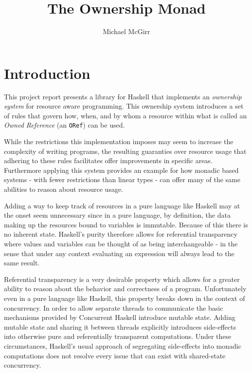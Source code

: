\documentclass[onehalf,11pt]{beavtex}
\title{The Ownership Monad}
\author{Michael McGirr}
\begin{document}
\maketitle

\mainmatter

\chapter{Introduction}

This project report presents a library for Haskell that implements an
\textit{ownership system} for resource aware programming. This ownership system
introduces a set of rules that govern how, when, and by whom a resource within
what is called an \textit{Owned Reference} (an \texttt{ORef}) can be used.

While the restrictions this implementation imposes may seem to increase the
complexity of writing programs, the resulting guaranties over resource usage
that adhering to these rules facilitates offer improvements in specific areas.
Furthermore applying this system provides an example for how monadic based
systems - with fewer restrictions than linear types - can offer many of the same
abilities to reason about resource usage.

Adding a way to keep track of resources in a pure language like Haskell may
at the onset seem unnecessary since in a pure language, by definition, %
the data making up the resources bound to variables is immutable. Because of
this there is no inherent state.  Haskell's purity therefore allows for referential
transparency where values and variables can be thought of as being
interchangeable - in the sense that under any context evaluating an expression will
always lead to the same result. %

Referential transparency is a very desirable property which allows for a greater
ability to reason about the behavior and correctness of a program.
Unfortunately even in a pure language like Haskell, this property breaks down in
the context of concurrency.  In order to allow separate threads to communicate
the basic mechanisms provided by Concurrent Haskell introduce mutable state.
Adding mutable state and sharing it between threads explicitly introduces
side-effects into otherwise pure and referentially transparent computations.
Under these circumstances, Haskell's usual approach of segregating side-effects
into monadic computations does not resolve every issue that can exist with
shared-state concurrency.
\end{document}

